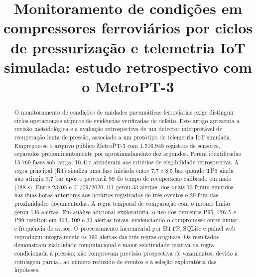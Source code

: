 \documentclass[conference]{IEEEtran}
\begin{document}
\title{Monitoramento de condições em compressores ferroviários por ciclos de pressurização e telemetria IoT simulada: estudo retrospectivo com o MetroPT-3}
\author{%
}
\maketitle


\begin{abstract}
O monitoramento de condições de unidades pneumáticas ferroviárias exige distinguir ciclos operacionais atípicos de evidências verificadas de defeito. Este artigo apresenta a revisão metodológica e a avaliação retrospectiva de um detector interpretável de recuperação lenta de pressão, associado a um protótipo de telemetria IoT simulada. Empregou-se o arquivo público MetroPT-3 com 1.516.948 registros de sensores, separados predominantemente por aproximadamente dez segundos. Foram identificadas 15.769 fases sob carga; 10.417 atenderam aos critérios de elegibilidade retrospectiva. A regra principal (R1) sinaliza uma fase iniciada entre 7,7 e 8,5 bar quando TP3 ainda não atingiu 9,7 bar após o percentil 99 do tempo de recuperação calibrado em maio (188 s). Entre 23/05 e 01/09/2020, R1 gerou 33 alertas, dos quais 13 foram emitidos nas duas horas anteriores aos horários registrados de três eventos e 20 fora das proximidades documentadas. A regra temporal de comparação com o mesmo limiar gerou 136 alertas. Em análise adicional exploratória, o uso dos percentis P95, P97,5 e P99 resultou em 363, 109 e 33 alertas totais, evidenciando o compromisso entre limiar e frequência de avisos. O processamento incremental por HTTP, SQLite e painel web reproduziu integralmente os 190 alertas das três regras originais. Os resultados demonstram viabilidade computacional e maior seletividade relativa da regra condicionada à pressão; não comprovam previsão prospectiva de vazamentos, devido à rotulagem parcial, ao número reduzido de eventos e à seleção exploratória das hipóteses.
\end{abstract}
\end{document}

